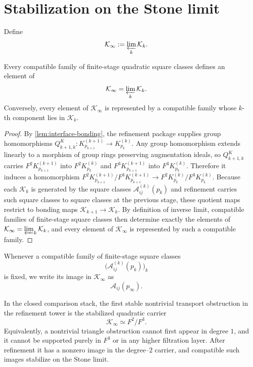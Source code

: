 \section{Stabilization on the Stone limit}
\label{sec:interface-stabilization}
\begin{definition}
	Define
	\[
		\mathcal K_\infty
		:=
		\varprojlim_k \mathcal K_k.
	\]
\end{definition}
\begin{theorem}
	\label{thm:interface-stabilized}
	Every compatible family of finite-stage quadratic square classes defines
	an element of
	\[
		\mathcal K_\infty=\varprojlim_k \mathcal K_k.
	\]
	Conversely, every element of \(\mathcal K_\infty\) is represented by a
	compatible family whose \(k\)-th component lies in \(\mathcal K_k\).
\end{theorem}
\begin{proof}
	By \cref{lem:interface-bonding}, the refinement package supplies
	group homomorphisms
	\(Q_{k+1,k}^{K}:K_{p_{k+1}}^{(k+1)}\to K_{p_k}^{(k)}\). Any group
	homomorphism extends linearly to a morphism of group rings preserving
	augmentation ideals, so \(Q_{k+1,k}^{K}\) carries
	\(F^2K_{p_{k+1}}^{(k+1)}\) into \(F^2K_{p_k}^{(k)}\) and
	\(F^3K_{p_{k+1}}^{(k+1)}\) into \(F^3K_{p_k}^{(k)}\). Therefore it
	induces a homomorphism
	\(F^2K_{p_{k+1}}^{(k+1)}/F^3K_{p_{k+1}}^{(k+1)}\to
	F^2K_{p_k}^{(k)}/F^3K_{p_k}^{(k)}\). Because each
	\(\mathcal K_k\) is generated by the square classes
	\(\mathcal A_{ij}^{(k)}(p_k)\) and refinement carries such square
	classes to square classes at the previous stage, these quotient maps
	restrict to bonding maps \(\mathcal K_{k+1}\to\mathcal K_k\). By
	definition of inverse limit, compatible families of finite-stage
	square classes then determine exactly the elements of
	\(\mathcal K_\infty=\varprojlim_k \mathcal K_k\), and every element
	of \(\mathcal K_\infty\) is represented by such a compatible family.
\end{proof}
\begin{definition}
	Whenever a compatible family of finite-stage square classes
	\[
		\bigl(\mathcal A_{ij}^{(k)}(p_k)\bigr)_k
	\]
	is fixed, we write its image in \(\mathcal K_\infty\) as
	\[
		\mathcal A_{ij}(p_\infty).
	\]
\end{definition}
\begin{theorem}
	\label{thm:interface-seal}
	In the closed comparison stack, the first stable nontrivial transport
	obstruction in the refinement tower is the stabilized quadratic carrier
	\[
		\mathcal K_\infty\simeq F^2/F^3.
	\]
	Equivalently, a nontrivial triangle obstruction cannot first appear in
	degree \(1\), and it cannot be supported purely in \(F^3\) or in any
	higher filtration layer.  After refinement it has a nonzero image in the
	degree--\(2\) carrier, and compatible such images stabilize on the Stone
	limit.
\end{theorem}
